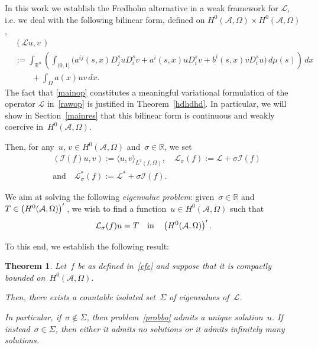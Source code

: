 \documentclass[11pt,hyp,]{nyjm}
\numberwithin{equation}{section}
\newcommand{\R}{\mathbb{R}}
\newtheorem{theorem}{Theorem}[section]
\theoremstyle{remark}
\newcommand{\am}{\mathcal{A}}
\begin{document}
In this work we establish the Fredholm alternative in a weak framework for $\mathcal{L}$, i.e. we deal with the following bilinear form, defined on $H^0(\mathcal{A}, \Omega) \times  H^0(\mathcal{A}, \Omega)$,
\begin{equation}\label{mainop}
\begin{split}&
\left(\mathcal{L}u, v \, \right) \\&
:= \int_{\R^n} \left( \int_{(0,1]} \Big(a^{ij}(s,x) D^s_ju D^s_i v + a^i(s,x) u D^s_i v + b^i(s,x)v D^s_i u \Big)\, d\mu(s)  \right)\, dx \\
&\quad\quad+ \int_{\Omega} a(x) u v \, dx.
\end{split} 
\end{equation}
The fact that \eqref{mainop}
constitutes a meaningful variational formulation of the operator $\mathcal{L}$ in~\eqref{rawop} is justified in Theorem~\ref{hdhdhd}. In particular, we will show in Section~\ref{mainres} that this bilinear form is continuous and weakly coercive in~$H^0(\mathcal{A}, \Omega)$.


Then, for any~$u$, $v \in H^0(\mathcal{A}, \Omega)$ and~$\sigma \in \R$, we set
\begin{equation}\label{jnh}\begin{split}&
( \mathcal{I}(f) u, v ) := \langle u,v \rangle_{L^2(f, \Omega)}, \quad \mathcal{L}_{\sigma}(f) := \mathcal{L}+ \sigma  \mathcal{I}(f) \\&\mbox{and}\quad \mathcal{L}^*_{\sigma}(f) := \mathcal{L}^*+ \sigma  \mathcal{I}(f).\end{split}
\end{equation}



{W}e aim at solving the following \textit{eigenvalue problem}: given~$\sigma \in \R$ and~$T \in \left(H^0(\mathcal{A}, \Omega )\right)\rq{}$, we wish to find a function~$u \in H^0(\mathcal{A}, \Omega)$ such that
\begin{equation}\label{probbo}
 \mathcal{L}_{\sigma}(f) u = T \quad\mbox{in}\quad \left(H^0(\mathcal{A}, \Omega )\right)\rq{}.
\end{equation}

To this end, we establish the following result:

\begin{theorem}\label{provv}
Let~$f$ be as defined in~\eqref{efe} and suppose that it is compactly bounded on~$H^0(\am, \Omega)$.

Then, there exists a countable isolated set~$\Sigma$ of eigenvalues of~$\mathcal{L}$.

In particular, if~$\sigma \notin \Sigma$, then problem~\eqref{probbo} admits a unique solution~$u$.
If instead~$\sigma \in \Sigma$, then either it admits no solutions or it admits infinitely many solutions.  
\end{theorem}
\end{document}
